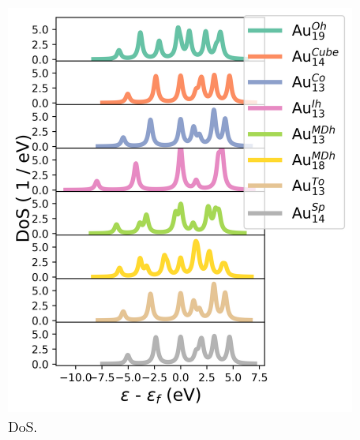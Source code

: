 \begin{figure}
    \begin{subfigure}{0.335\textwidth}
        \includegraphics[width=\textwidth]{figures/LM/Atomistic/Au_NPs_DoS.png}
        \caption{DoS.}
        \label{fig:AuNPs_DoS}
    \end{subfigure}
    \begin{subfigure}{0.335\textwidth}

\end{subfigure}
\end{figure}
